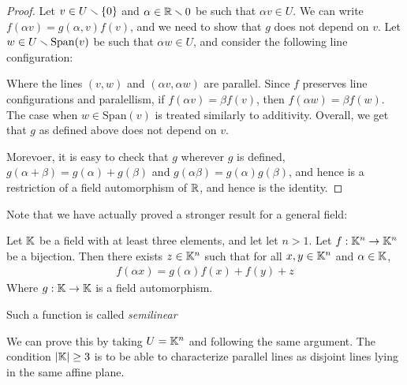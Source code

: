 \begin{proof}
  Let $v\in U\smallsetminus \{0\}$ and $\alpha \in \mathbb{R}\smallsetminus 0$ be such that 
  $\alpha v\in U$. We can write $f(\alpha v) = g(\alpha,v)f(v)$, and
  we need to show that $g$ does not depend on $v$. Let
  $w\in U\smallsetminus \mathrm{Span}(v)$ be such that $\alpha w\in U$, 
  and consider the following line configuration:
  \begin{figure}
    \centering
  \end{figure}
  Where the lines $(v,w)$ and $(\alpha v,\alpha w)$ are parallel. 
  Since $f$ preserves line configurations and paralellism, if 
  $f(\alpha v) = \beta f(v)$, then 
  $f(\alpha w) = \beta f(w)$. The case when 
  $w\in \mathrm{Span}(v)$ is treated similarly to additivity. 
  Overall, we get that $g$ as defined above 
  does not depend on $v$.

  Morevoer, it is easy to check that $g$ wherever 
  $g$ is defined, $g(\alpha+\beta) = g(\alpha) + g(\beta)$ 
  and $g(\alpha\beta) = g(\alpha)g(\beta)$, and hence 
  is a restriction of a field 
  automorphism of $\mathbb{R}$, and hence is the identity.
\end{proof}
Note that we have actually proved a stronger result 
for a general field:
\begin{theorem}
  Let $\mathbb{K}$ be a field with at least three elements, and 
  let let $n>1$. Let $f:\mathbb{K}^n\to \mathbb{K}^n$ be a bijection. Then 
  there exists $z\in \mathbb{K}^n$ such that for all 
  $x,y\in \mathbb{K}^n$ and $\alpha\in \mathbb{K}$,
  \begin{align*}
    f(\alpha x) = g(\alpha)f(x) + f(y) + z
  \end{align*}
  Where $g:\mathbb{K}\to\mathbb{K}$ is a field automorphism.

  Such a function is called \textit{semilinear}
\end{theorem}
We can prove this by taking $U = \mathbb{K}^n$ and following the same argument. 
The condition $|\mathbb{K}|\ge 3$ is to be able to characterize 
parallel lines as disjoint lines lying in the same affine plane.

